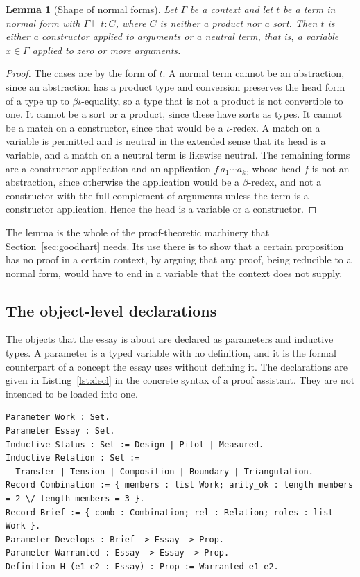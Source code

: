 \documentclass[11pt]{article}
\theoremstyle{plain}
\newtheorem{lemma}[theorem]{Lemma}
\theoremstyle{definition}
\theoremstyle{remark}
\begin{document}
\begin{lemma}[Shape of normal forms]\label{lem:neutral}
Let $\Gamma$ be a context and let $t$ be a term in normal form with $\Gamma\vdash t : C$, where $C$ is neither a product nor a sort. Then $t$ is either a constructor applied to arguments or a \emph{neutral} term, that is, a variable $x\in\Gamma$ applied to zero or more arguments.
\end{lemma}

\begin{proof}
The cases are by the form of $t$. A normal term cannot be an abstraction, since an abstraction has a product type and conversion preserves the head form of a type up to $\beta\iota$-equality, so a type that is not a product is not convertible to one. It cannot be a sort or a product, since these have sorts as types. It cannot be a match on a constructor, since that would be a $\iota$-redex. A match on a variable is permitted and is neutral in the extended sense that its head is a variable, and a match on a neutral term is likewise neutral. The remaining forms are a constructor application and an application $f\,a_1\cdots a_k$, whose head $f$ is not an abstraction, since otherwise the application would be a $\beta$-redex, and not a constructor with the full complement of arguments unless the term is a constructor application. Hence the head is a variable or a constructor. \qedhere
\end{proof}

The lemma is the whole of the proof-theoretic machinery that Section~\ref{sec:goodhart} needs. Its use there is to show that a certain proposition has no proof in a certain context, by arguing that any proof, being reducible to a normal form, would have to end in a variable that the context does not supply.

\subsection{The object-level declarations}

The objects that the essay is about are declared as parameters and inductive types. A parameter is a typed variable with no definition, and it is the formal counterpart of a concept the essay uses without defining it. The declarations are given in Listing~\ref{lst:decl} in the concrete syntax of a proof assistant. They are not intended to be loaded into one.

\begin{lstlisting}[caption={Object-level declarations (unchecked).},label={lst:decl}]
Parameter Work : Set.
Parameter Essay : Set.
Inductive Status : Set := Design | Pilot | Measured.
Inductive Relation : Set :=
  Transfer | Tension | Composition | Boundary | Triangulation.
Record Combination := { members : list Work; arity_ok : length members = 2 \/ length members = 3 }.
Record Brief := { comb : Combination; rel : Relation; roles : list Work }.
Parameter Develops : Brief -> Essay -> Prop.
Parameter Warranted : Essay -> Essay -> Prop.
Definition H (e1 e2 : Essay) : Prop := Warranted e1 e2.
\end{lstlisting}
\end{document}
